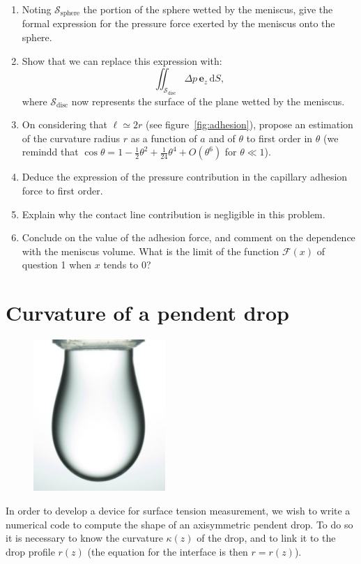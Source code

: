 \documentclass[11pt,a4paper]{article}
\begin{document}
\begin{enumerate}[resume]
\item Noting $\mathcal S_\text{sphere}$ the portion of the sphere wetted by the meniscus, give the formal expression for the pressure force exerted by the meniscus onto the sphere.
\item Show that we can replace this expression with:
$$
\iint_{\mathcal S_\text{disc}} \!\!\!\Delta p \,\boldsymbol e_z \, \mathrm dS,
$$
where $\mathcal S_\text{disc}$ now represents the surface of the plane wetted by the meniscus.
\item On considering that $\ell \simeq 2r$ (see figure~\ref{fig:adhesion}), propose an estimation of the curvature radius $r$ as a function of $a$ and of $\theta$ to first order in  $\theta$ (we remindd that $\cos \theta = 1 - \tfrac{1}{2} \theta^2 + \tfrac{1}{24} \theta^4 + O(\theta^6)$ for $\theta \ll 1$).
\item Deduce the expression of the pressure contribution in the capillary adhesion force to first order.
\item Explain why the contact line contribution is negligible in this problem.
\item Conclude on the value of the adhesion force, and comment on the dependence with the meniscus volume. What is the limit of the function $ \mathcal F(x)$ of question 1 when $x$ tends to 0?
\end{enumerate}
\section{Curvature of a pendent drop}

\begin{figure}
\centering
\includegraphics[width=5cm]{goutte_eau_jussieu.png}
\end{figure}
 
In order to develop a device for surface tension measurement, we wish to write a numerical code to compute the shape of an axisymmetric pendent drop.
To do so it is necessary to know the curvature $\kappa(z)$ of the drop, and to link it to the drop profile $r(z)$ (the equation for the interface is then $r = r(z)$).
\end{document}
